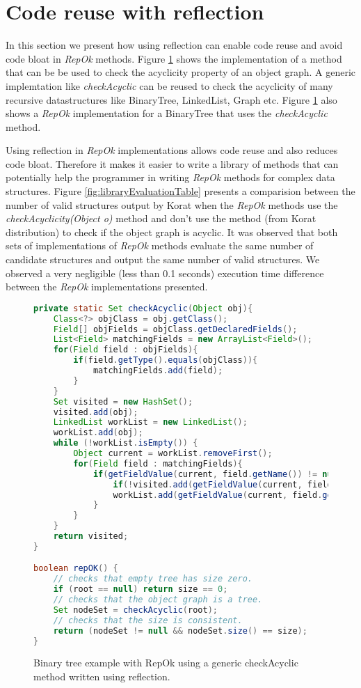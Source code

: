 \section{Code reuse with reflection}
\label{sec:code-reuse-with-reflection}
In this section we present how using reflection can enable code reuse
and avoid code bloat in \emph{RepOk} methods. Figure
\ref{fig:btreeAcyclicRepOk} shows the implementation of a method that
can be be used to check the acyclicity property of an object graph. A
generic implemtation like \emph{checkAcyclic} can be reused to check
the acyclicity of many recursive datastructures like BinaryTree,
LinkedList, Graph etc. Figure \ref{fig:btreeAcyclicRepOk} also shows a
\emph{RepOk} implementation for a BinaryTree that uses the
\emph{checkAcyclic} method.

\para Using reflection in \emph{RepOk} implementations allows code
reuse and also reduces code bloat. Therefore it makes it easier to
write a library of methods that can potentially help the programmer in
writing \emph{RepOk} methods for complex data structures. Figure
\ref{fig:libraryEvaluationTable}  presents a comparision between the number of valid
structures output by Korat when the \emph{RepOk} methods use the
\emph{checkAcyclicity(Object o)} method and don't use the method (from
Korat distribution) to check if the object graph is acyclic. It was
observed that both sets of implementations of \emph{RepOk} methods
evaluate the same number of candidate structures and output the same
number of valid structures. We observed a very negligible (less than
0.1 seconds) execution time difference between the \emph{RepOk}
implementations presented.


\begin{figure}
\centering
\begin{lstlisting}[language=Java]
private static Set checkAcyclic(Object obj){
    Class<?> objClass = obj.getClass();
    Field[] objFields = objClass.getDeclaredFields();
    List<Field> matchingFields = new ArrayList<Field>();
    for(Field field : objFields){
        if(field.getType().equals(objClass)){
            matchingFields.add(field);
        }
    }
    Set visited = new HashSet();
    visited.add(obj);
    LinkedList workList = new LinkedList();
    workList.add(obj);
    while (!workList.isEmpty()) {
        Object current = workList.removeFirst();
        for(Field field : matchingFields){
            if(getFieldValue(current, field.getName()) != null){
                if(!visited.add(getFieldValue(current, field.getName()))) return null;
                workList.add(getFieldValue(current, field.getName()));
            }
        }
    }
    return visited;
}

boolean repOK() {
    // checks that empty tree has size zero.
    if (root == null) return size == 0;
    // checks that the object graph is a tree.
    Set nodeSet = checkAcyclic(root);
    // checks that the size is consistent.
    return (nodeSet != null && nodeSet.size() == size);
}
\end{lstlisting}
\caption{Binary tree example with RepOk using a generic checkAcyclic method written using reflection.}
\label{fig:btreeAcyclicRepOk}
\end{figure}



